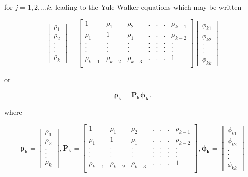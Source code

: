 \documentclass[]{book}
\begin{document}
for \(j=1, 2, ...k\), leading to the Yule-Walker equations which may be written

\begin{equation}
\label{eq:pacf}
\left[\begin{array}
{r}
\rho_1  \\
\rho_2  \\
.\\
.\\
.\\
\rho_k
\end{array}\right] = \left[\begin{array}
{rrrrrrr}
1 & \rho_1 & \rho_2 & .&.&.& \rho_{k-1} \\
\rho_1 & 1 & \rho_1 & .&.&.& \rho_{k-2} \\
. & . & . & .&.&.& . \\
. & . & . & .&.&.& . \\
. & . & . & .&.&.& . \\
\rho_{k-1} & \rho_{k-2} & \rho_{k-3} & .&.&.& 1 \\
\end{array}\right] \left[\begin{array}
{r}
\phi_{k1}  \\
\phi_{k2}  \\
.\\
.\\
.\\
\phi_{kk}
\end{array}\right]
\end{equation}

or

\[\symbf{\rho_k}=\symbf{P_k\phi_k}.\]

where

\[\symbf{\rho_k} = \left[\begin{array}
{r}
\rho_1  \\
\rho_2  \\
.\\
.\\
.\\
\rho_k
\end{array}\right], \mathbf{P_k} =\left[\begin{array}
{rrrrrrr}
1 & \rho_1 & \rho_2 & .&.&.& \rho_{k-1} \\
\rho_1 & 1 & \rho_1 & .&.&.& \rho_{k-2} \\
. & . & . & .&.&.& . \\
. & . & . & .&.&.& . \\
. & . & . & .&.&.& . \\
\rho_{k-1} & \rho_{k-2} & \rho_{k-3} & .&.&.& 1 \\
\end{array}\right], \symbf{\phi_k} = \left[\begin{array}
{r}
\phi_{k1}  \\
\phi_{k2}  \\
.\\
.\\
.\\
\phi_{kk}
\end{array}\right]\]
\end{document}

